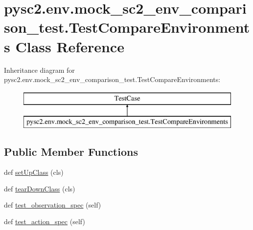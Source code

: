 \hypertarget{classpysc2_1_1env_1_1mock__sc2__env__comparison__test_1_1_test_compare_environments}{}\section{pysc2.\+env.\+mock\+\_\+sc2\+\_\+env\+\_\+comparison\+\_\+test.\+Test\+Compare\+Environments Class Reference}
\label{classpysc2_1_1env_1_1mock__sc2__env__comparison__test_1_1_test_compare_environments}
Inheritance diagram for pysc2.\+env.\+mock\+\_\+sc2\+\_\+env\+\_\+comparison\+\_\+test.\+Test\+Compare\+Environments\+:\begin{figure}[H]
\begin{center}
\leavevmode
\includegraphics[height=2.000000cm]{classpysc2_1_1env_1_1mock__sc2__env__comparison__test_1_1_test_compare_environments}
\end{center}
\end{figure}
\subsection*{Public Member Functions}
\begin{DoxyCompactItemize}
\item 
def \mbox{\hyperlink{classpysc2_1_1env_1_1mock__sc2__env__comparison__test_1_1_test_compare_environments_a76cbd7c5b511f308ece39037bb137cc5}{set\+Up\+Class}} (cls)
\item 
def \mbox{\hyperlink{classpysc2_1_1env_1_1mock__sc2__env__comparison__test_1_1_test_compare_environments_a56c0f6118f90e9dc8d8abbdeef4262f3}{tear\+Down\+Class}} (cls)
\item 
def \mbox{\hyperlink{classpysc2_1_1env_1_1mock__sc2__env__comparison__test_1_1_test_compare_environments_adda79fd06c2fe23a5f84a970c916bb18}{test\+\_\+observation\+\_\+spec}} (self)
\item 
def \mbox{\hyperlink{classpysc2_1_1env_1_1mock__sc2__env__comparison__test_1_1_test_compare_environments_aa70c2b18f216a6fdac75499e9e0198b8}{test\+\_\+action\+\_\+spec}} (self)
\end{DoxyCompactItemize}


